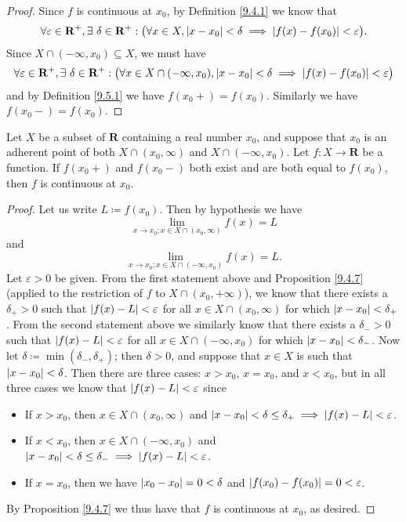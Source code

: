 \begin{proof}
    Since \(f\) is continuous at \(x_0\), by Definition \ref{9.4.1} we know that
    \[
        \forall \varepsilon \in \mathbf{R}^+, \exists\ \delta \in \mathbf{R}^+ : \big(\forall x \in X, \abs*{x - x_0} < \delta \implies \abs*{f(x) - f(x_0)} < \varepsilon\big).
    \]
    Since \(X \cap (-\infty, x_0) \subseteq X\), we must have
    \[
        \forall \varepsilon \in \mathbf{R}^+, \exists\ \delta \in \mathbf{R}^+ : \big(\forall x \in X \cap (-\infty, x_0), \abs*{x - x_0} < \delta \implies \abs*{f(x) - f(x_0)} < \varepsilon\big)
    \]
    and by Definition \ref{9.5.1} we have \(f(x_0+) = f(x_0)\).
    Similarly we have \(f(x_0-) = f(x_0)\).
\end{proof}

\setcounter{theorem}{2}
\begin{proposition}\label{9.5.3}
    Let \(X\) be a subset of \(\mathbf{R}\) containing a real number \(x_0\), and suppose that \(x_0\) is an adherent point of both \(X \cap (x_0, \infty)\) and \(X \cap (-\infty, x_0)\).
    Let \(f : X \to \mathbf{R}\) be a function.
    If \(f(x_0+)\) and \(f(x_0-)\) both exist and are both equal to \(f(x_0)\), then \(f\) is continuous at \(x_0\).
\end{proposition}

\begin{proof}
    Let us write \(L \coloneqq f(x_0)\).
    Then by hypothesis we have
    \[
        \lim_{x \to x_0 ; x \in X \cap (x_0, \infty)} f(x) = L
    \]
    and
    \[
        \lim_{x \to x_0 ; x \in X \cap (-\infty, x_0)} f(x) = L.
    \]
    Let \(\varepsilon > 0\) be given.
    From the first statement above and Proposition \ref{9.4.7} (applied to the restriction of \(f\) to \(X \cap (x_0, +\infty)\)), we know that there exists a \(\delta_+ > 0\) such that \(\abs*{f(x) - L} < \varepsilon\) for all \(x \in X \cap(x_0, \infty)\) for which \(\abs*{x - x_0} < \delta_+\).
    From the second statement above we similarly know that there exists a \(\delta_- > 0\) such that \(\abs*{f(x) - L} < \varepsilon\) for all \(x \in X \cap (-\infty, x_0)\) for which \(\abs*{x - x_0} < \delta_-\).
    Now let \(\delta \coloneqq \min(\delta_-, \delta_+)\);
    then \(\delta > 0\), and suppose that \(x \in X\) is such that \(\abs*{x - x_0} < \delta\).
    Then there are three cases:
    \(x > x_0\), \(x = x_0\), and \(x < x_0\), but in all three cases we know that \(\abs*{f(x) - L} < \varepsilon\) since
    \begin{itemize}
        \item If \(x > x_0\), then \(x \in X \cap (x_0, \infty)\) and \(\abs*{x - x_0} < \delta \leq \delta_+ \implies \abs*{f(x) - L} < \varepsilon\).
        \item If \(x < x_0\), then \(x \in X \cap (-\infty, x_0)\) and \(\abs*{x - x_0} < \delta \leq \delta_- \implies \abs*{f(x) - L} < \varepsilon\).
        \item If \(x = x_0\), then we have \(\abs*{x_0 - x_0} = 0 < \delta\) and \(\abs*{f(x_0) - f(x_0)} = 0 < \varepsilon\).
    \end{itemize}
    By Proposition \ref{9.4.7} we thus have that \(f\) is continuous at \(x_0\), as desired.
\end{proof}

